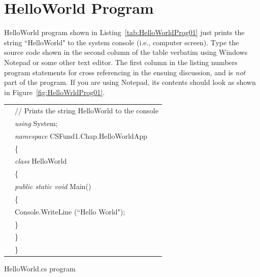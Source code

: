 
{\samepage\vspace{1ex}\noindent\usebox{\phicsep}\vspace{1.5ex}}
\vspace{-0.4in}
\section{HelloWorld Program} \label{sec:HelloWorldProg}




HelloWorld program shown in Listing~\ref{tab:HelloWorldProg01}
just prints the string ``HelloWorld" to the system console (i.e.,
computer screen). Type the source code shown in the second column
of the table verbatim using Windows Notepad or some other text
editor. The first column in the listing numbers program statements
for cross referencing in the ensuing discussion, and is \emph{not}
part of the program. If you are using Notepad, its contents should
look as shown in Figure~\ref{fig:HelloWrldProg01}.


\renewcommand{\baselinestretch}{0.8}
\begin{program}
\begin{tabular}{ >{\codelinenumfont}c >{\codelistingfont}l}

1 & // Prints the string HelloWorld to the console \\
2 & \emph{using} System; \\
3 & \emph{namespace} CSFund1.Chap\thechapter.HelloWorldApp \\
4 & \{ \\
5 & \hspace{0.2in} \emph{class} HelloWorld \\
6 & \hspace{0.2in} \{ \\
7 & \hspace{0.4in} \emph{public static void} Main() \\
8 & \hspace{0.4in} \{ \\
9 & \hspace{0.6in} Console.WriteLine (``Hello World"); \\
10 & \hspace{0.4in} \} \\
11 & \hspace{0.2in} \} \\
12 & \} \\ [0.05in]
\end{tabular}
\caption{HelloWorld.cs program} \label{tab:HelloWorldProg01}
\end{program}
\renewcommand{\baselinestretch}{1.0}



